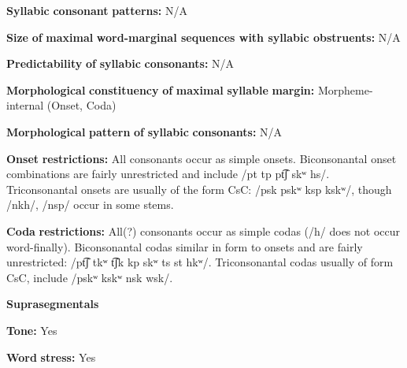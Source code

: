 \begin{styleBody}
\textbf{Syllabic} \textbf{consonant} \textbf{patterns:} N/A
\end{styleBody}

\begin{styleBody}
\textbf{Size} \textbf{of} \textbf{maximal} \textbf{word{}-marginal sequences with syllabic obstruents:} N/A
\end{styleBody}

\begin{styleBody}
\textbf{Predictability} \textbf{of} \textbf{syllabic} \textbf{consonants:} N/A
\end{styleBody}

\begin{styleBody}
\textbf{Morphological} \textbf{constituency} \textbf{of} \textbf{maximal} \textbf{syllable} \textbf{margin:} Morpheme-internal (Onset, Coda)
\end{styleBody}

\begin{styleBody}
\textbf{Morphological} \textbf{pattern} \textbf{of} \textbf{syllabic} \textbf{consonants:} N/A
\end{styleBody}

\begin{styleBody}
\textbf{Onset} \textbf{restrictions:} All consonants occur as simple onsets. Biconsonantal onset combinations are fairly unrestricted and include /pt tp pt͡ʃ skʷ hs/. Triconsonantal onsets are usually of the form CsC: /psk pskʷ ksp kskʷ/, though /nkh/, /nsp/ occur in some stems.
\end{styleBody}

\begin{styleBody}
\textbf{Coda} \textbf{restrictions:} All(?) consonants occur as simple codas (/h/ does not occur word-finally). Biconsonantal codas similar in form to onsets and are fairly unrestricted: /pt͡ʃ tkʷ t͡ʃk kp skʷ ts st hkʷ/. Triconsonantal codas usually of form CsC, include /pskʷ kskʷ nsk wsk/.
\end{styleBody}

\begin{styleBody}
\textbf{Suprasegmentals}
\end{styleBody}

\begin{styleBody}
\textbf{Tone:} Yes
\end{styleBody}

\begin{styleBody}
\textbf{Word} \textbf{stress:} Yes
\end{styleBody}

